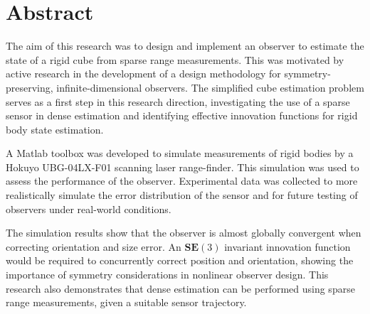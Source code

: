 \chapter*{Abstract}

The aim of this research was to design and implement an observer to estimate the state of a rigid cube from sparse range measurements. This was motivated by active research in the development of a design methodology for symmetry-preserving, infinite-dimensional observers. The simplified cube estimation problem serves as a first step in this research direction, investigating the use of a sparse sensor in dense estimation and identifying effective innovation functions for rigid body state estimation. 

A Matlab toolbox was developed to simulate measurements of rigid bodies by a Hokuyo UBG-04LX-F01 scanning laser range-finder. This simulation was used to assess the performance of the observer. Experimental data was collected to more realistically simulate the error distribution of the sensor and for future testing of observers under real-world conditions. 

The simulation results show that the observer is almost globally convergent when correcting orientation and size error. An $\mathbf{SE}(3)$ invariant innovation function would be required to concurrently correct position and orientation, showing the importance of symmetry considerations in nonlinear observer design. This research also demonstrates that dense estimation can be performed using sparse range measurements, given a suitable sensor trajectory. 


